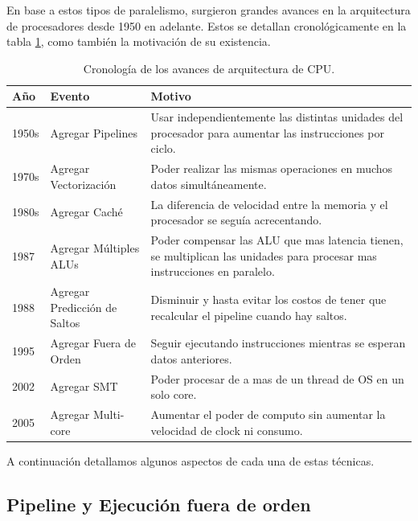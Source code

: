 En base a estos tipos de paralelismo, surgieron grandes avances en la arquitectura de procesadores desde
1950 en adelante. Estos se detallan cronol\'ogicamente en la tabla \ref{tbl:historia-cpu}, como tambi\'en
la motivaci\'on de su existencia.

\newcommand{\blap}[1]{\begin{minipage}[t]{3in}#1\end{minipage}}


\begin{table}[h]
\renewcommand{\arraystretch}{2.0}
\centering
\begin{tabular}{lll}
\hline
A\~no & Evento & Motivo \\ \hline
1950s & Agregar Pipelines &  \blap{Usar independientemente las distintas unidades del procesador para aumentar las instrucciones por ciclo.} \\
1970s & Agregar Vectorizaci\'on & \blap{Poder realizar las mismas operaciones en muchos datos simult\'aneamente.} \\
1980s & Agregar Cach\'e & \blap{La diferencia de velocidad entre la memoria y el procesador se segu\'ia acrecentando.} \\
1987 & Agregar M\'ultiples ALUs & \blap{Poder compensar las ALU que mas latencia tienen, se multiplican las unidades para procesar mas instrucciones en paralelo.} \\
1988 & Agregar Predicci\'on de Saltos & \blap{Disminuir y hasta evitar los costos de tener que recalcular el pipeline cuando hay saltos.} \\
1995 & Agregar Fuera de Orden & \blap{Seguir ejecutando instrucciones mientras se esperan datos anteriores.} \\
2002 & Agregar SMT & \blap{Poder procesar de a mas de un thread de OS en un solo core.} \\
2005 & Agregar Multi-core & \blap{Aumentar el poder de computo sin aumentar la velocidad de clock ni consumo.} \\
\end{tabular}
  \caption{Cronolog\'ia de los avances de arquitectura de CPU.}
  \label{tbl:historia-cpu}
\end{table}

A continuaci\'on detallamos algunos aspectos de cada una de estas t\'ecnicas.

\subsection{Pipeline y Ejecuci\'on fuera de orden}

